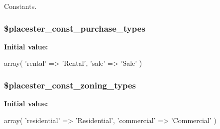 Constants. 

\hypertarget{const_8php_ae2a8e9945874c6e2e7346d04ece006cc}{
\subsubsection[{\$placester\_\-const\_\-purchase\_\-types}]{\setlength{\rightskip}{0pt plus 5cm}\$placester\_\-const\_\-purchase\_\-types}}
\label{d0/d02/const_8php_ae2a8e9945874c6e2e7346d04ece006cc}
{\bfseries Initial value:}
\begin{DoxyCode}
 
    array(
        'rental' => 'Rental',
        'sale' => 'Sale'
    )
\end{DoxyCode}
\hypertarget{const_8php_a5e04c7d3b6395dc0b9b32d9aa7b0afb5}{
\subsubsection[{\$placester\_\-const\_\-zoning\_\-types}]{\setlength{\rightskip}{0pt plus 5cm}\$placester\_\-const\_\-zoning\_\-types}}
\label{d0/d02/const_8php_a5e04c7d3b6395dc0b9b32d9aa7b0afb5}
{\bfseries Initial value:}
\begin{DoxyCode}
 
    array(
        'residential' => 'Residential',
        'commercial' => 'Commercial'
    )
\end{DoxyCode}
